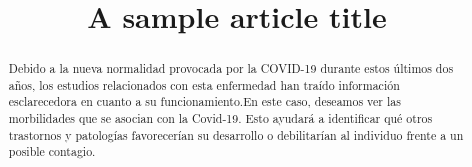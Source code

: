 \documentclass{bmcart}
\begin{document}
	\begin{frontmatter}
	
		\begin{fmbox}
			
			
			\title{A sample article title}
			
			
			\author[
			  addressref={aff1},                   %
			  corref={aff1},                       %
			  email={inesdiazdelrey@gmail.com}   %
			]{ } %
			\author[
			  addressref={aff1},
			  email={rythemond@gmail.com}
			]{ }
			\author[
			addressref={aff1},
			email={claauudiiaa24@gmail.com}
			]{ }
			
			
			\address[id=aff1]{%
			  ,             %
			  ,          %
			  ,                              %
			}
		
		\end{fmbox}%
		
		\begin{abstractbox}
		
			\begin{abstract} 
			

			Debido a la nueva normalidad provocada por la COVID-19 durante estos últimos dos años, los estudios relacionados con esta enfermedad han traído información esclarecedora 			en cuanto a su funcionamiento.En este caso, deseamos ver las morbilidades que se asocian con la Covid-19. Esto ayudará a identificar qué otros trastornos y patologías 				favorecerían su desarrollo o debilitarían al individuo frente a un posible contagio.


\end{abstract}
\end{abstractbox}
\end{frontmatter}
\end{document}
